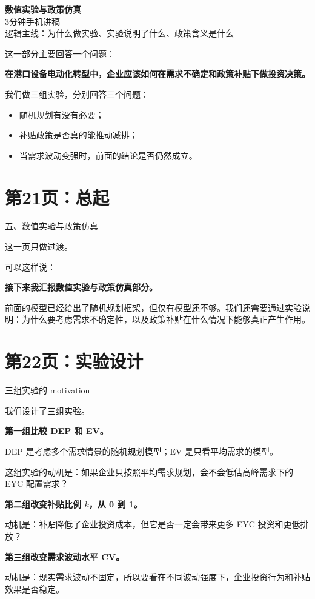 \documentclass[UTF8,zihao=false,12pt]{ctexart}
\newcommand{\slide}[2]{%
  \section*{#1}
  {\color{muted}#2}\par
  \vspace{0.4em}
}
\begin{document}
\begin{center}
  {\Huge\bfseries 数值实验与政策仿真}\\[0.7em]
  {\Large 3分钟手机讲稿}\\[0.8em]
  {\color{muted}逻辑主线：为什么做实验、实验说明了什么、政策含义是什么}
\end{center}

\vspace{1em}

这一部分主要回答一个问题：

\textbf{在港口设备电动化转型中，企业应该如何在需求不确定和政策补贴下做投资决策。}

我们做三组实验，分别回答三个问题：

\begin{itemize}
  \item 随机规划有没有必要；
  \item 补贴政策是否真的能推动减排；
  \item 当需求波动变强时，前面的结论是否仍然成立。
\end{itemize}

\newpage

\slide{第21页：总起}{五、数值实验与政策仿真}

这一页只做过渡。

可以这样说：

\textbf{接下来我汇报数值实验与政策仿真部分。}

前面的模型已经给出了随机规划框架，但仅有模型还不够。我们还需要通过实验说明：为什么要考虑需求不确定性，以及政策补贴在什么情况下能够真正产生作用。

\newpage

\slide{第22页：实验设计}{三组实验的 motivation}

我们设计了三组实验。

\textbf{第一组比较 DEP 和 EV。}

DEP 是考虑多个需求情景的随机规划模型；EV 是只看平均需求的模型。

这组实验的动机是：如果企业只按照平均需求规划，会不会低估高峰需求下的 EYC 配置需求？

\textbf{第二组改变补贴比例 $k$，从 0 到 1。}

动机是：补贴降低了企业投资成本，但它是否一定会带来更多 EYC 投资和更低排放？

\textbf{第三组改变需求波动水平 CV。}

动机是：现实需求波动不固定，所以要看在不同波动强度下，企业投资行为和补贴效果是否稳定。

\newpage
\end{document}
